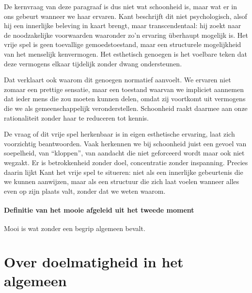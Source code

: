 \begin{mdframed}[leftmargin=0pt,rightmargin=0pt,backgroundcolor=blue!6,linecolor=white,innertopmargin=6pt,innerbottommargin=6pt]
De kernvraag van deze paragraaf is dus niet wat schoonheid is, maar wat er in ons gebeurt wanneer we haar ervaren. Kant beschrijft dit niet psychologisch, alsof hij een innerlijke beleving in kaart brengt, maar transcendentaal: hij zoekt naar de noodzakelijke voorwaarden waaronder zo’n ervaring überhaupt mogelijk is. Het vrije spel is geen toevallige gemoedstoestand, maar een structurele mogelijkheid van het menselijk kenvermogen. Het esthetisch genoegen is het voelbare teken dat deze vermogens elkaar tijdelijk zonder dwang ondersteunen.

Dat verklaart ook waarom dit genoegen normatief aanvoelt. We ervaren niet zomaar een prettige sensatie, maar een toestand waarvan we impliciet aannemen dat ieder mens die zou moeten kunnen delen, omdat zij voortkomt uit vermogens die we als gemeenschappelijk veronderstellen. Schoonheid raakt daarmee aan onze rationaliteit zonder haar te reduceren tot kennis.

De vraag of dit vrije spel herkenbaar is in eigen esthetische ervaring, laat zich voorzichtig beantwoorden. Vaak herkennen we bij schoonheid juist een gevoel van soepelheid, van “kloppen”, van aandacht die niet geforceerd wordt maar ook niet wegzakt. Er is betrokkenheid zonder doel, concentratie zonder inspanning. Precies daarin lijkt Kant het vrije spel te situeren: niet als een innerlijke gebeurtenis die we kunnen aanwijzen, maar als een structuur die zich laat voelen wanneer alles even op zijn plaats valt, zonder dat we weten waarom.
\end{mdframed}

\paragraph{Definitie van het mooie afgeleid uit het tweede moment}

Mooi is wat zonder een begrip algemeen bevalt.


\section{Over doelmatigheid in het algemeen}

